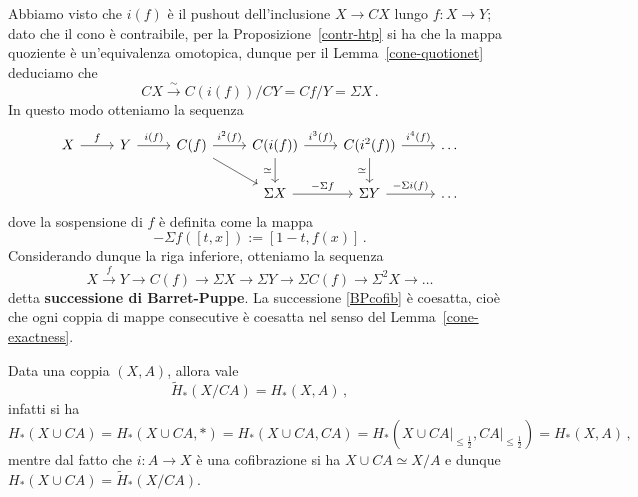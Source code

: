 Abbiamo visto che $i(f)$ è il pushout dell'inclusione
$X \to CX$ lungo $f:X \to Y$; dato che il cono è contraibile,
per la Proposizione~\ref{contr-htp} si ha che la mappa
quoziente è un'equivalenza omotopica, dunque
per il Lemma~\ref{cone-quotionet} deduciamo che
\begin{equation*}
	CX \xrightarrow{\sim} C(i(f))/CY = Cf/Y = \Sigma X\,. 
\end{equation*}
In questo modo otteniamo la sequenza
\begin{equation*}
	\begin{tikzcd}
		X \ar[r, "f"]
		& Y \ar[r,"i(f)"] 
		& C(f) \ar[r,"i^2(f)"] \ar[dr] 
		& C(i(f)) \ar[r,"i^3(f)"] \ar[d, "\simeq"']
		& C(i^2(f)) \ar[r,"i^4(f)"] \ar[d, "\simeq"'] & \dots \\
		& & & \Sigma X \ar[r, "-\Sigma f"]
		& \Sigma Y \ar[r, "-\Sigma i(f)"]
		& \dots
	\end{tikzcd}
\end{equation*}
dove la sospensione di $f$ è definita come la mappa
\begin{equation*}
	-\Sigma f \left([t,x]\right) := [1-t,f(x)]\,.
\end{equation*}
Considerando dunque la riga inferiore, otteniamo la sequenza
\begin{equation}\label{BPcofib}
	X \xrightarrow{f} Y \to C(f) \to \Sigma X \to \Sigma Y 
	\to \Sigma C(f) \to \Sigma^{2} X \to \dots
\end{equation}
detta \textbf{successione di Barret-Puppe}.
La successione \eqref{BPcofib} è coesatta,
cioè che ogni coppia di mappe consecutive è coesatta
nel senso del Lemma~\ref{cone-exactness}.


\begin{oss}
	Data una coppia $(X,A)$, allora vale
	\begin{equation*}
		\widetilde{H}_{*}(X / CA) = H_{*}(X,A)\,,
	\end{equation*}
	infatti si ha
	\begin{equation*}
		H_{*}(X \cup CA) 
		= H_{*}(X \cup CA, \ast)
		= H_{*}(X \cup CA, CA)
		= H_{*}(X \cup CA\vert_{\le \frac{1}{2}}, CA\vert_{\le \frac{1}{2}})
		= H_{*}(X,A)\,,
	\end{equation*}
	mentre dal fatto che $i:A \to X$ è una cofibrazione
	si ha $X \cup CA \simeq X/A$ e dunque $H_{*}(X \cup CA)  
	= \widetilde{H}_{*}(X/CA)$.
\end{oss}

















